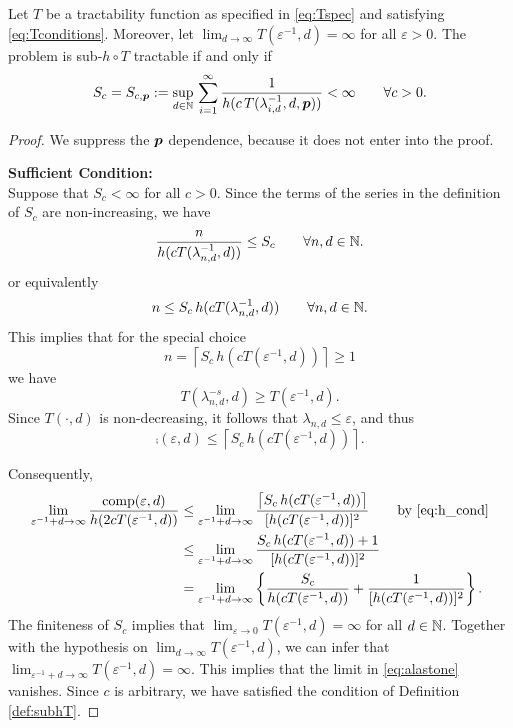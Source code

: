 \documentclass[11pt,a4paper]{article}
\begin{document}
\begin{theorem}\label{thm:subhT}
	Let $T$ be a tractability function as specified in \eqref{eq:Tspec} and satisfying \eqref{eq:Tconditions}.  Moreover, let $\lim_{d \to \infty} T(\varepsilon^{-1},d) = \infty$ for all $\varepsilon > 0$.  The problem is sub-$h \circ T$ tractable if and only if
	\[
	S_c = S_{c,\boldsymbol{p}} :=\sup_{d\in\mathbb{N}}  \, \sum_{i=1}^\infty \frac1{h(c\, T(\lambda_{i,d}^{-1},d,\boldsymbol{p}))} <\infty \qquad \forall c > 0.
	\]
\end{theorem}
\begin{proof}
We suppress the $\boldsymbol{p}$ dependence, because it does not enter into the proof.

\bigskip

\noindent \textbf{Sufficient Condition:}\\	
Suppose that $S_c <\infty$ for all $c>0$.  Since the terms of the series in the definition of $S_c$ are non-increasing, we have 
	\[
		\frac{n}{h(cT(\lambda_{n,d}^{-1},d))}\le S_c \qquad \forall n,d \in \mathbb{N}.
	\]
or equivalently
\[
	n\le S_c \, h(cT(\lambda_{n,d}^{-1},d))   \qquad \forall n,d \in \mathbb{N}.
\]
This implies that for the special choice 
\[
	n = \left\lceil 
	S_c \, h(cT(\varepsilon^{-1},d))  
	\right\rceil \ge 1
\]
	we have
	\[
	T(\lambda_{n,d}^{-s},d) \ge T(\varepsilon^{-1},d).
	\]
Since $T(\cdot,d)$ is non-decreasing, it follows that $\lambda_{n,d} \le \varepsilon$, and thus 
\[
\comp(\varepsilon,d) \le  \left\lceil 
S_c \, h(cT(\varepsilon^{-1},d))  
\right\rceil.  
\]
	
Consequently,
\begin{align}
\nonumber
\lim_{\varepsilon^{-1} + d \to \infty} \frac{\operatorname{comp}(\varepsilon,d)}{ h(2cT(\varepsilon^{-1},d))  }
& \le \lim_{\varepsilon^{-1} + d \to \infty} \frac{ \left\lceil 
	S_c \, h(cT(\varepsilon^{-1},d)) \right\rceil}{ [h(cT(\varepsilon^{-1},d))]^2  } \qquad \text{by \eqref{eq:h_cond}}
\\
\nonumber
& \le \lim_{\varepsilon^{-1} + d \to \infty} \frac{
	S_c \, h(cT(\varepsilon^{-1},d))+1}{ [h(cT(\varepsilon^{-1},d))]^2  }  \\
& = \lim_{\varepsilon^{-1} + d \to \infty} \left \{\frac{
	S_c }{ h(cT(\varepsilon^{-1},d))  }  + \frac{
	1}{ [h(cT(\varepsilon^{-1},d))]^2 } \right \} \label{eq:alastone}.
\end{align}	
The finiteness of $S_c$ implies that $\lim_{\varepsilon \to 0} T(\varepsilon^{-1},d) = \infty$ for all $d \in \mathbb{N}$.  Together with the hypothesis on $\lim_{d \to \infty} T(\varepsilon^{-1},d)$, we can infer that $\lim_{\varepsilon^{-1} + d \to \infty} T(\varepsilon^{-1},d) = \infty$.  This implies that the limit in \eqref{eq:alastone} vanishes.  Since $c$ is arbitrary, we have satisfied the condition of Definition \ref{def:subhT}.


\end{proof}
\end{document}

